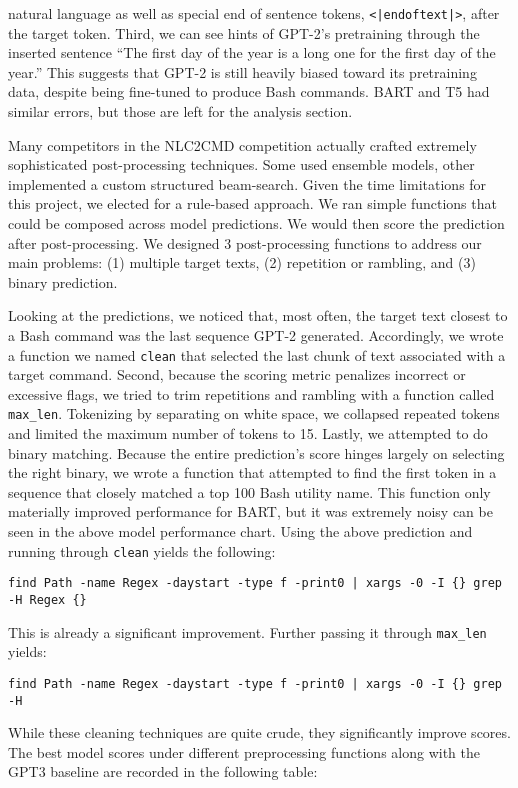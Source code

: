 \documentclass{article}
\begin{document}
natural language as well as special end of sentence tokens,
\texttt{<|endoftext|>}, after the target token. Third, we can see hints of
GPT-2's pretraining through the inserted sentence ``The first day of the year is
a long one for the first day of the year.'' This suggests that GPT-2 is still
heavily biased toward its pretraining data, despite being fine-tuned to produce
Bash commands. BART and T5 had similar errors, but those are left for the
analysis section.
\par
Many competitors in the NLC2CMD competition actually crafted extremely
sophisticated post-processing techniques. Some used ensemble models, other
implemented a custom structured beam-search. Given the time limitations for
this project, we elected for a rule-based approach. We ran simple functions
that could be composed across model predictions. We would then score the
prediction after post-processing. We designed 3 post-processing functions to
address our main problems: (1) multiple target texts, (2) repetition or
rambling, and (3) binary prediction.
\par
Looking at the predictions, we noticed that, most often, the target text
closest to a Bash command was the last sequence GPT-2 generated. Accordingly, we
wrote a function we named \texttt{clean} that selected the last chunk of text
associated with a target command. Second, because the scoring metric penalizes
incorrect or excessive flags, we tried to trim repetitions and rambling with a
function called \texttt{max\_len}. Tokenizing by separating on white space, we
collapsed repeated tokens and limited the maximum number of tokens to 15.
Lastly, we attempted to do binary matching. Because the entire prediction's
score hinges largely on selecting the right binary, we wrote a function that
attempted to find the first token in a sequence that closely matched a top 100
Bash utility name. This function only materially improved performance for BART,
but it was extremely noisy can be seen in the above model performance chart.
Using the above prediction and running through \texttt{clean} yields the
following:
\begin{verbatim}
find Path -name Regex -daystart -type f -print0 | xargs -0 -I {} grep -H Regex {}
\end{verbatim}
This is already a significant improvement. Further passing it through
\texttt{max\_len} yields:
\begin{verbatim}
find Path -name Regex -daystart -type f -print0 | xargs -0 -I {} grep -H
\end{verbatim}
While these cleaning techniques are quite crude, they significantly improve
scores. The best model scores under different preprocessing functions along
with the GPT3 baseline are recorded in the following table:
\end{document}
